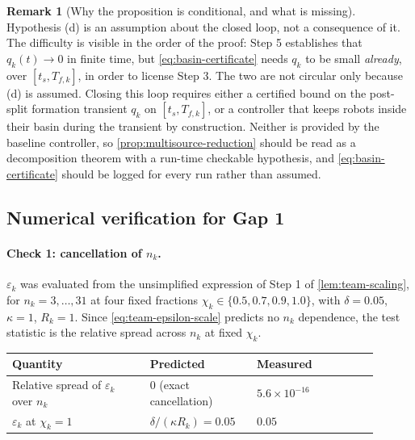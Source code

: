 \documentclass[11pt,a4paper]{article}
\theoremstyle{plain}
\theoremstyle{definition}
\newtheorem{remark}{Remark}
\begin{document}
\begin{remark}[Why the proposition is conditional, and what is missing]\label{rem:gap1-conditional}
Hypothesis (d) is an assumption about the closed loop, not a consequence of it. The difficulty is
visible in the order of the proof: Step 5 establishes that $q_k(t)\to0$ in finite time, but
\eqref{eq:basin-certificate} needs $q_k$ to be small \emph{already}, over
$[t_s,T_{f,k}]$, in order to license Step 3. The two are not circular only because (d) is
assumed. Closing this loop requires either a certified bound on the post-split formation
transient $q_k$ on $[t_s,T_{f,k}]$, or a controller that keeps robots inside their basin during
the transient by construction. Neither is provided by the baseline controller, so
\cref{prop:multisource-reduction} should be read as a decomposition theorem with a run-time
checkable hypothesis, and \eqref{eq:basin-certificate} should be logged for every run rather than
assumed.
\end{remark}

\subsection{Numerical verification for Gap 1}\label{sec:gap1-numerics}

\paragraph{Check 1: cancellation of $n_k$.}
$\varepsilon_k$ was evaluated from the unsimplified expression of Step 1 of
\cref{lem:team-scaling}, for $n_k=3,\ldots,31$ at four fixed fractions
$\chi_k\in\{0.5,0.7,0.9,1.0\}$, with $\delta=0.05$, $\kappa=1$, $R_k=1$. Since
\eqref{eq:team-epsilon-scale} predicts no $n_k$ dependence, the test statistic is the relative
spread across $n_k$ at fixed $\chi_k$.

\begin{center}
\begin{longtable}{@{}p{0.34\linewidth}p{0.26\linewidth}p{0.30\linewidth}@{}}
\toprule
Quantity & Predicted & Measured \\
\midrule
\endhead
Relative spread of $\varepsilon_k$ over $n_k$ & $0$ (exact cancellation) & $5.6\times10^{-16}$ \\
$\varepsilon_k$ at $\chi_k=1$ & $\delta/(\kappa R_k)=0.05$ & $0.05$ \\
\bottomrule
\end{longtable}
\end{center}
\end{document}
